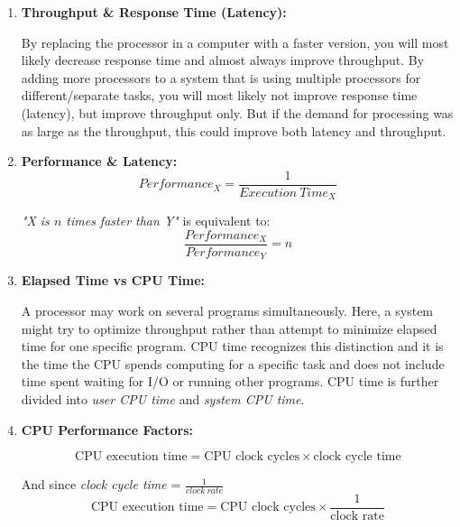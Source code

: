 \documentclass[12pt]{article}
\begin{document}
\begin{enumerate}
    \item \textbf{Throughput \& Response Time (Latency):} 
    
    \quad By replacing the processor in a computer with a faster version, you will most likely decrease response time and almost always improve throughput. By adding more processors to a system that is using multiple processors for different/separate tasks, you will most likely not improve response time (latency), but improve throughput only. But if the demand for processing was as large as the throughput, this could improve both latency and throughput.
    
    \item \textbf{Performance \& Latency:}
    \begin{equation}
    Performance_{X} = \frac{1}{Execution\ Time_{X}}
    \end{equation}
    
    \textit{"X is $n$ times faster than Y"} is equivalent to: 
    \begin{equation}
    \frac{Performance_{X}}{Performance_{Y}} = n
    \end{equation}
    
    \item \textbf{Elapsed Time vs CPU Time:}
    
    \quad A processor may work on several programs simultaneously. Here, a system might try to optimize throughput rather than attempt to minimize elapsed time for one specific program. CPU time recognizes this distinction and it is the time the CPU spends computing for a specific task and does not include time spent waiting for I/O or running other programs. CPU time is further divided into \textit{user CPU time} and \textit{system CPU time}.
    
    \item \textbf{CPU Performance Factors:}
    
    \begin{equation}
        \text{CPU execution time} = \text{CPU clock cycles} \times \text{clock cycle time}
    \end{equation}
    
    And since \textit{clock cycle time} = $\frac{1}{clock\ rate}$
    \begin{equation}
        \text{CPU execution time} = \text{CPU clock cycles} \times \frac{1}{\text{clock rate}}
    \end{equation}
    

\end{enumerate}
\end{document}
